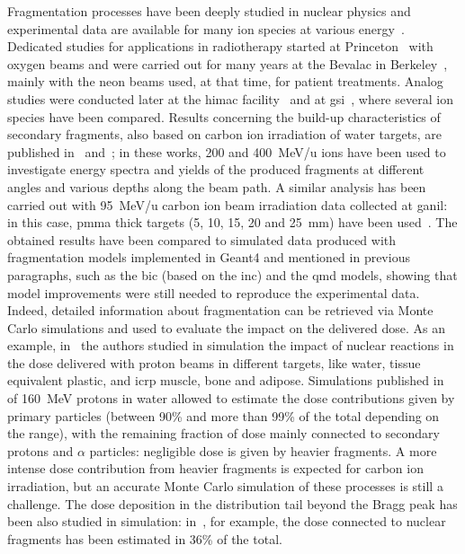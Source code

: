 Fragmentation processes have been deeply studied in nuclear physics and experimental data are available for many ion species at various energy~\parencite{Friedlander1982}. Dedicated studies for applications in radiotherapy started at Princeton~\parencite{MacCabee1974} with oxygen beams and were carried out for many years at the Bevalac in Berkeley~\parencite{Schimmerling1983, Schimmerling1989, Llacer1984, Llacer1990}, mainly with the neon beams used, at that time, for patient treatments. Analog studies were conducted later at the \gls{himac} facility~\parencite{Matsufuji2003, Matsufuji2005} and at \gls{gsi}~\parencite{Schall1996, Golovkov1997}, where several ion species have been compared. Results concerning the build-up characteristics of secondary fragments, also based on carbon ion irradiation of water targets, are published in~\cite{Haettner2006} and~\cite{Haettner2013}; in these works, 200 and 400~MeV/u ions have been used to investigate energy spectra and yields of the produced fragments at different angles and various depths along the beam path. A similar analysis has been carried out with 95~MeV/u carbon ion beam irradiation data collected at \gls{ganil}: in this case, \gls{pmma} thick targets (5, 10, 15, 20 and 25~mm) have been used~\parencite{Braunn2010, Braunn2011}. The obtained results have been compared to simulated data produced with fragmentation models implemented in Geant4 and mentioned in previous paragraphs, such as the \gls{bic} (based on the \gls{inc}) and the \gls{qmd} models, showing that model improvements were still needed to reproduce the experimental data.
Indeed, detailed information about fragmentation can be retrieved via Monte Carlo simulations and used to evaluate the impact on the delivered dose. As an example, in~\cite{Wroe2005} the authors studied in simulation the impact of nuclear reactions in the dose delivered with proton beams in different targets, like water, tissue equivalent plastic, and \gls{icrp} muscle, bone and adipose. Simulations published in~\parencite{Grassberger2011} of 160~MeV protons in water allowed to estimate the dose contributions given by primary particles (between 90\% and more than 99\% of the total depending on the range), with the remaining fraction of dose mainly connected to secondary protons and $\alpha$ particles: negligible dose is given by heavier fragments. A more intense dose contribution from heavier fragments is expected for carbon ion irradiation, but an accurate Monte Carlo simulation of these processes is still a challenge. The dose deposition in the distribution tail beyond the Bragg peak has been also studied in simulation: in~\cite{Francis2014}, for example, the dose connected to nuclear fragments has been estimated in 36\% of the total. 

